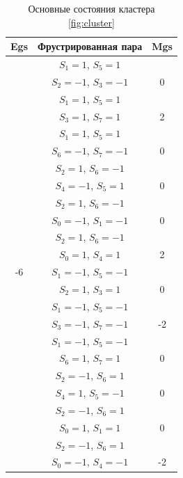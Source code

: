 \documentclass[utf8, babel, sor, jor, amsmath, amssymb, reprint]{elsarticle} %
\begin{document}
\begin{table}[H]
	\centering
	\begin{tabular}{|c|c|c|}
		\hline
		Egs   &   Фрустрированная пара & Mgs\\
		\hline
		  &  $S_1=1$, $S_5=1$ & \\
		      &    $S_2=-1$, $S_3=-1$ &0 \\
		 \cline{2-3}
		   &  $S_1=1$, $S_5=1$ &\\
		      &    $S_3=1$, $S_7=1$ & 2\\
		 \cline{2-3}
		   &  $S_1=1$, $S_5=1$ & \\
		      &    $S_6=-1$, $S_7=-1$ & 0\\
		 \cline{2-3}
		  &  $S_2=1$, $S_6=-1$ & \\
				&    $S_4=-1$, $S_5=1$ & 0\\
		 \cline{2-3}
		  &  $S_2=1$, $S_6=-1$ &\\
				&    $S_0=-1$, $S_1=-1$ & 0\\
		 \cline{2-3}
		   &  $S_2=1$, $S_6=-1$ &\\
				&    $S_0=1$, $S_4=1$ & 2\\
				\cline{2-3}
				-6	\multirow{3}{*}{}
		   &  $S_1=-1$, $S_5=-1$ &\\
			&    $S_2=1$, $S_3=1$ & 0\\
		\cline{2-3}
		   &  $S_1=-1$, $S_5=-1$ &\\
			&    $S_3=-1$, $S_7=-1$ & -2\\
		\cline{2-3}
		   &  $S_1=-1$, $S_5=-1$ &\\
			&    $S_6=1$, $S_7=1$ & 0\\
	\cline{2-3}
		   &  $S_2=-1$, $S_6=1$ &\\
			&    $S_4=1$, $S_5=-1$ & 0\\
	\cline{2-3}
		   &  $S_2=-1$, $S_6=1$ &\\
			&    $S_0=1$, $S_1=1$ & 0\\
		\cline{2-3}
		   &  $S_2=-1$, $S_6=1$ &\\
			&    $S_0=-1$, $S_4=-1$ & -2\\
		\hline
	\end{tabular}
	\caption{Основные состояния кластера \eqref{fig:cluster}}
	\label{tab:gs_cl}
\end{table}
\end{document}

